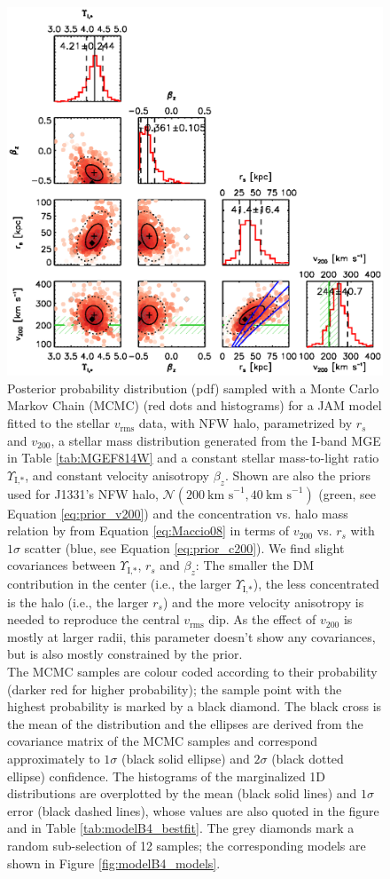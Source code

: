 \documentclass[useAMS,usenatbib]{mnras}
\begin{document}
\begin{figure}
\centering
\includegraphics[width=0.9\linewidth]{fig/B4_contour_plot_short.ps}
\caption{Posterior probability distribution (pdf) sampled with a Monte Carlo Markov Chain (MCMC) (red dots and histograms) for a JAM model fitted to the stellar $v_\text{rms}$ data, with NFW halo, parametrized by $r_s$ and $v_\text{200}$, a stellar mass distribution generated from the I-band MGE in Table \ref{tab:MGEF814W} and a constant stellar mass-to-light ratio $\Upsilon_\text{I,*}$, and constant velocity anisotropy $\beta_z$. Shown are also the priors used for J1331's NFW halo, $\mathscr{N}(200~\text{km s}^{-1},40~\text{km s}^{-1})$ (green, see Equation \eqref{eq:prior_v200}) and the concentration vs. halo mass relation by \citet{Maccio08} from Equation \eqref{eq:Maccio08} in terms of $v_{200}$ vs. $r_s$ with $1\sigma$ scatter (blue, see Equation \eqref{eq:prior_c200}). We find slight covariances between $\Upsilon_\text{I,*}$,  $r_s$ and $\beta_z$: The smaller the DM contribution in the center (i.e., the larger $\Upsilon_\text{I,*}$), the less concentrated is the halo (i.e., the larger $r_s$) and the more velocity anisotropy is needed to reproduce the central $v_\text{rms}$ dip. As the effect of $v_{200}$ is mostly at larger radii, this parameter doesn't show any covariances, but is also mostly constrained by the prior.\\The MCMC samples are colour coded according to their probability (darker red for higher probability); the sample point with the highest probability is marked by a black diamond. The black cross is the mean of the distribution and the ellipses are derived from the covariance matrix of the MCMC samples and correspond approximately to $1\sigma$ (black solid ellipse) and $2\sigma$ (black dotted ellipse) confidence. The histograms of the marginalized 1D distributions are overplotted by the mean (black solid lines) and $1\sigma$ error (black dashed lines), whose values are also quoted in the figure and in Table \ref{tab:modelB4_bestfit}. The grey diamonds mark a random sub-selection of 12 samples; the corresponding models are shown in Figure \ref{fig:modelB4_models}.}

\end{figure}
\end{document}
